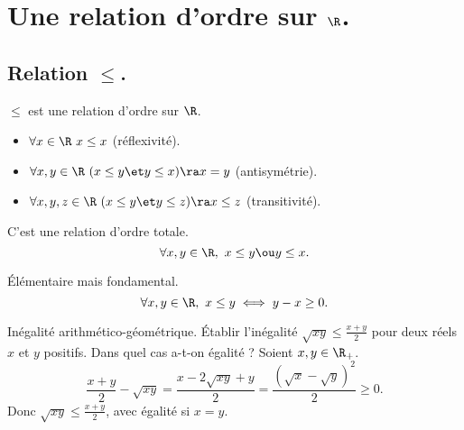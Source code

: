 \documentclass[11pt]{article}
\begin{document}


\thispagestyle{fancy}

\section{Une relation d'ordre sur \texorpdfstring{$\R$}{Lg}.}
\subsection{Relation \texorpdfstring{$\leq$}{Lg}.}

\begin{rappel}{$\leq$ est une relation d'ordre sur $\R$.}{}
    \begin{itemize}
        \item $\forall x\in\R~x\leq x$ (réflexivité).
        \item $\forall x,y\in\R~(x\leq y \et y\leq x)\ra x=y$ (antisymétrie).
        \item $\forall x,y,z \in \R~(x\leq y \et y \leq z) \ra x \leq z$ (transitivité).
    \end{itemize}
\end{rappel}

\begin{rappel}{C'est une relation d'ordre totale.}{}
    \begin{equation*}
        \forall x,y \in\R,~ x\leq y \ou y\leq x. 
    \end{equation*}
\end{rappel}

\begin{rappel}{Élémentaire mais fondamental.}{}
    \begin{equation*}
        \forall x,y\in\R,~x\leq y \iff y - x \geq 0.
    \end{equation*}
\end{rappel}

\begin{ex}{Inégalité arithmético-géométrique.}{}
    Établir l'inégalité $\sqrt{xy}\leq\frac{x+y}{2}$ pour deux réels $x$ et $y$ positifs. Dans quel cas a-t-on égalité ?
    \tcblower
    Soient $x,y\in\R_+$.
    \begin{equation*}
        \frac{x+y}{2}-\sqrt{xy}=\frac{x-2\sqrt{xy}+y}{2}=\frac{(\sqrt{x}-\sqrt{y})^2}{2}\geq 0.
    \end{equation*}
    Donc $\sqrt{xy}\leq\frac{x+y}{2}$, avec égalité si $x=y$.
\end{ex}
\end{document}

